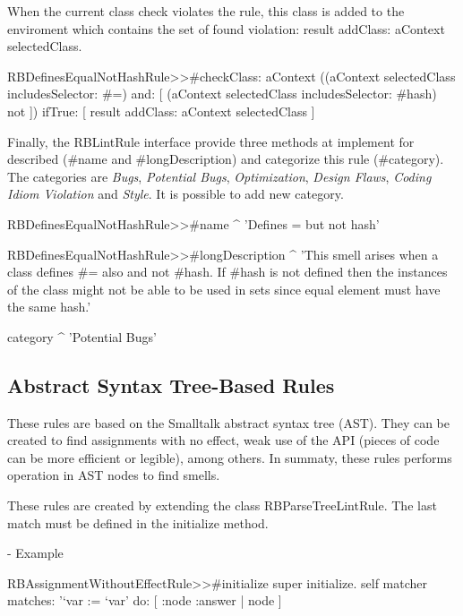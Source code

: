 \documentclass[a4paper,10pt,twoside]{book}
\begin{document}
When the current class check violates the rule, this class is added to the enviroment which contains the set of found violation: result addClass: aContext selectedClass. 

\begin{code}{}
RBDefinesEqualNotHashRule>>#checkClass: aContext 
	((aContext selectedClass includesSelector: #=) and: 
		[ (aContext selectedClass includesSelector: #hash) not ])
			 ifTrue: [ result addClass: aContext selectedClass ]
\end{code}



Finally, the RBLintRule interface provide three methods at implement for described (#name and #longDescription) and categorize this rule (#category). The categories are \emph{Bugs}, \emph{Potential Bugs}, \emph{Optimization}, \emph{Design Flaws}, \emph{Coding Idiom Violation} and \emph{Style}. It is possible to add new category.
\begin{code}{}
RBDefinesEqualNotHashRule>>#name
	^ 'Defines = but not hash'
\end{code}

\begin{code}{}
RBDefinesEqualNotHashRule>>#longDescription
	^ 'This smell arises when a class defines #= also and not #hash. If #hash is not defined then the instances of the class might not be able to be used in sets since equal element must have the same hash.'
\end{code}

\begin{code}{}
category 
	^ 'Potential Bugs'
\end{code}

\subsection{Abstract Syntax Tree-Based Rules}

These rules are based on the Smalltalk abstract syntax tree (AST). They can be created to find assignments with no effect, weak use of the API (pieces of code can be more efficient or legible), among others. In summaty, these rules performs operation in AST nodes to find smells.

These rules are created by extending the class RBParseTreeLintRule. The last match must be defined in the initialize method.


- Example

\begin{code}{}
RBAssignmentWithoutEffectRule>>#initialize
	super initialize.
	self matcher 
		matches: '`var := `var'
		do: [ :node :answer | node ]
\end{code}
\end{document}
